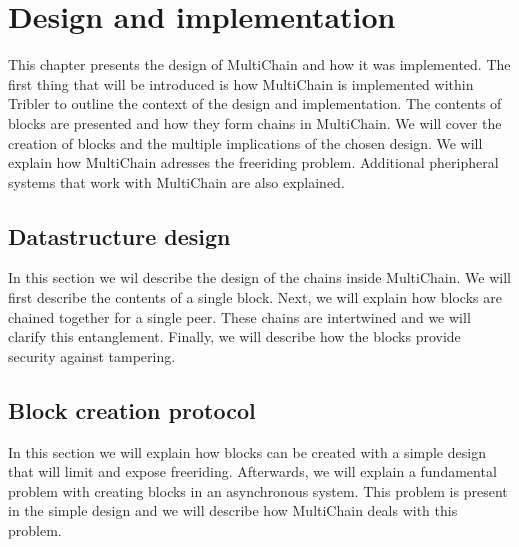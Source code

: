 \chapter{Design and implementation}
\label{chapt:design}
This chapter presents the design of MultiChain and how it was implemented.
The first thing that will be introduced is how MultiChain is implemented within Tribler
to outline the context of the design and implementation.
The contents of blocks are presented and how they form chains in MultiChain.
We will cover the creation of blocks and the multiple implications of the chosen design.
We will explain how MultiChain adresses the freeriding problem.
Additional pheripheral systems that work with MultiChain are also explained.



\section{Datastructure design}
In this section we wil describe the design of the chains inside MultiChain.
We will first describe the contents of a single block.
Next, we will explain how blocks are chained together for a single peer.
These chains are intertwined and we will clarify this entanglement.
Finally, we will describe how the blocks provide security against tampering.






\section{Block creation protocol}
\label{design:block_creation}
In this section we will explain how blocks can be created with a simple design
that will limit and expose freeriding.
Afterwards, we will explain a fundamental problem with creating blocks in an asynchronous system.
This problem is present in the simple design
and we will describe how MultiChain deals with this problem.














